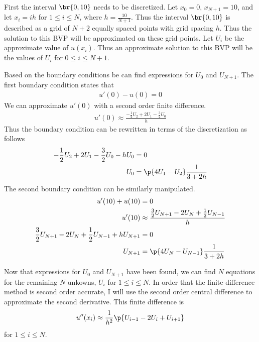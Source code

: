 \documentclass[11pt, oneside]{article}
\begin{document}
\begin{enumerate}
        First the interval $\br{0, 10}$ needs to be discretized.
        Let $x_0 = 0$, $x_{N + 1} = 10$, and let $x_{i} = ih$ for $1 \le i \le N$,
        where $h = \frac{10}{N+1}$.
        Thus the interval $\br{0, 10}$ is described as a grid of $N+2$ equally
        spaced points with grid spacing $h$.
        Thus the solution to this BVP will be approximated on these grid points.
        Let $U_i$ be the approximate value of $u(x_i)$.
        Thus an approximate solution to this BVP will be the values of $U_i$ for
        $0 \le i \le N+1$.

        Based on the boundary conditions be can find expressions for $U_0$ and
        $U_{N+1}$.
        The first boundary condition states that
        \begin{align*}
            u'(0) - u(0) = 0
        \end{align*}
        We can approximate $u'(0)$ with a second order finite difference.
        \begin{align*}
            u'(0) \approx \frac{-\frac{1}{2}U_2 + 2U_1 - \frac{3}{2}U_0}{h}
        \end{align*}
        Thus the boundary condition can be rewritten in terms of the
        discretization as follows
        \begin{align*}
            -\frac{1}{2}U_2 + 2U_1 - \frac{3}{2}U_0 - hU_0 &= 0 \\
            U_0 &= \p{4U_1 - U_2} \frac{1}{3 + 2h}
        \end{align*}
        The second boundary condition can be similarly manipulated.
        \begin{align*}
            u'(10) + u(10) &= 0 \\
            u'(10) &\approx  \frac{\frac{3}{2}U_{N+1} - 2U_N + \frac{1}{2}U_{N-1}}{h}\\
            \frac{3}{2}U_{N+1} - 2U_N + \frac{1}{2}U_{N-1} + hU_{N+1} &= 0 \\
            U_{N+1} &= \p{4U_N - U_{N-1}} \frac{1}{3 + 2h}
        \end{align*}

        Now that expressions for $U_0$ and $U_{N+1}$ have been found, we can
        find $N$ equations for the remaining $N$ unkowns, $U_{i}$ for
        $1 \le i \le N$.
        In order that the finite-difference method is second order accurate, I
        will use the second order central difference to approximate the second
        derivative.
        This finite difference is
        \begin{align*}
            u''(x_i) \approx \frac{1}{h^2}\p{U_{i-1} - 2U_{i} + U_{i+1}}
        \end{align*}
        for $1 \le i \le N$.


\end{enumerate}
\end{document}
